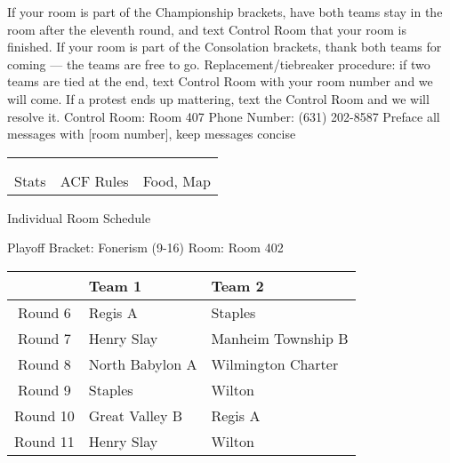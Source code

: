 \documentclass{article}%
\begin{document}
\vspace*{16pt}%
\linebreak%
If your room is part of the Championship brackets, have both teams stay in the room after the eleventh round, and text Control Room that your room is finished.\newline%
\newline%
If your room is part of the Consolation brackets, thank both teams for coming — the teams are free to go.\newline%
\newline%
Replacement/tiebreaker procedure: if two teams are tied at the end, text Control Room with your room number and we will come. If a protest ends up mattering, text the Control Room and we will resolve it.\newline%
\newline%
Control Room: Room 407\newline%
Phone Number: (631) 202{-}8587\newline%
Preface all messages with {[}room number{]}, keep messages concise%
\vspace*{30pt}%
\newline%
%
\begin{tabularx}{\textwidth}{YYY}%
  &  &  \\%
\\%
Stats&ACF Rules&Food, Map\\%
\end{tabularx}%
\newpage%
\begin{center}%
\begin{Huge}%
Individual Room Schedule%
\end{Huge}%
\vspace*{16pt}%
\linebreak%
\begin{Large}%
Playoff Bracket: Fonerism (9-16) \hfill Room: Room 402%
\end{Large}%
\end{center}%
%
\begin{tabularx}{\textwidth}{|c|Y|Y|}%
\hline%
&Team 1&Team 2\\%
\hline%
Round 6&Regis A&Staples\\%
Round 7&Henry Slay&Manheim Township B\\%
Round 8&North Babylon A&Wilmington Charter\\%
Round 9&Staples&Wilton\\%
Round 10&Great Valley B&Regis A\\%
Round 11&Henry Slay&Wilton\\%
\hline%
\end{tabularx}%
\end{document}
